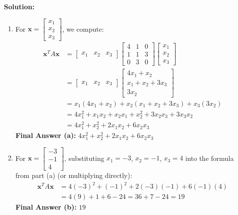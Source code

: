 \documentclass[11pt, letterpaper]{article}
\theoremstyle{definition}
\theoremstyle{remark}
\begin{document}
\textbf{Solution:}
\begin{enumerate}[label=\alph*.]
    \item For $\mathbf{x} = \begin{bmatrix} x_1 \\ x_2 \\ x_3 \end{bmatrix}$, we compute:
    \begin{align*}
        \mathbf{x}^T A \mathbf{x} &= \begin{bmatrix} x_1 & x_2 & x_3 \end{bmatrix} \begin{bmatrix} 4 & 1 & 0 \\ 1 & 1 & 3 \\ 0 & 3 & 0 \end{bmatrix} \begin{bmatrix} x_1 \\ x_2 \\ x_3 \end{bmatrix} \\
        &= \begin{bmatrix} x_1 & x_2 & x_3 \end{bmatrix} \begin{bmatrix} 4x_1 + x_2 \\ x_1 + x_2 + 3x_3 \\ 3x_2 \end{bmatrix} \\
        &= x_1(4x_1 + x_2) + x_2(x_1 + x_2 + 3x_3) + x_3(3x_2) \\
        &= 4x_1^2 + x_1x_2 + x_2x_1 + x_2^2 + 3x_2x_3 + 3x_3x_2 \\
        &= 4x_1^2 + x_2^2 + 2x_1x_2 + 6x_2x_3
    \end{align*}
    \textbf{Final Answer (a):} $4x_1^2 + x_2^2 + 2x_1x_2 + 6x_2x_3$

    \item For $\mathbf{x} = \begin{bmatrix} -3 \\ -1 \\ 4 \end{bmatrix}$, substituting $x_1 = -3$, $x_2 = -1$, $x_3 = 4$ into the formula from part (a) (or multiplying directly):
    \begin{align*}
        \mathbf{x}^T A \mathbf{x} &= 4(-3)^2 + (-1)^2 + 2(-3)(-1) + 6(-1)(4) \\
        &= 4(9) + 1 + 6 - 24 = 36 + 7 - 24 = 19
    \end{align*}
    \textbf{Final Answer (b):} $19$


\end{enumerate}
\end{document}
